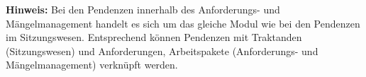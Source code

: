 \textbf{Hinweis:} Bei den Pendenzen innerhalb des Anforderungs- und Mängelmanagement handelt es sich um das gleiche Modul wie bei den Pendenzen im Sitzungswesen. Entsprechend können Pendenzen mit Traktanden (Sitzungswesen) und Anforderungen, Arbeitspakete (Anforderungs- und Mängelmanagement) verknüpft werden.







